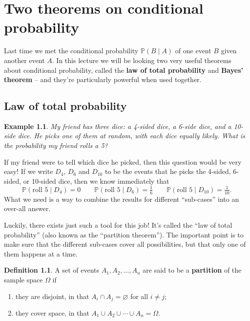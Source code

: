 \documentclass[
  a4paper,
]{book}
\providecommand{\tightlist}{%
  \setlength{\itemsep}{0pt}\setlength{\parskip}{0pt}}
\theoremstyle{definition}
\newtheorem{definition}{Definition}[chapter]
\theoremstyle{definition}
\newtheorem{example}{Example}[chapter]
\theoremstyle{definition}
\theoremstyle{definition}
\theoremstyle{remark}
\begin{document}
\hypertarget{L08-two-theorems}{%
\chapter{Two theorems on conditional probability}\label{L08-two-theorems}}

Last time we met the conditional probability \(\mathbb P(B \mid A)\) of one event \(B\) given another event \(A\). In this lecture we will be looking two very useful theorems about conditional probability, called the \textbf{law of total probability} and \textbf{Bayes' theorem} -- and they're particularly powerful when used together.

\hypertarget{total-prob}{%
\section{Law of total probability}\label{total-prob}}

\begin{example}
\protect\hypertarget{exm:dice-total}{}\label{exm:dice-total}\emph{My friend has three dice: a 4-sided dice, a 6-side dice, and a 10-side dice. He picks one of them at random, with each dice equally likely. What is the probability my friend rolls a 5?}

If my friend were to tell which dice he picked, then this question would be very easy! If we write \(D_4\), \(D_6\) and \(D_{10}\) to be the events that he picks the 4-sided, 6-sided, or 10-sided dice, then we know immediately that
\[ \mathbb P(\text{roll 5} \mid D_4) = 0 \qquad \mathbb P(\text{roll 5} \mid D_6) = \tfrac16 \qquad \mathbb P(\text{roll 5} \mid D_{10}) = \tfrac{1}{10} .  \]
What we need is a way to combine the results for different ``sub-cases'' into an over-all answer.
\end{example}

Luckily, there exists just such a tool for this job! It's called the ``law of total probability'' (also known as the ``partition theorem''). The important point is to make sure that the different sub-cases cover all possibilities, but that only one of them happens at a time.

\begin{definition}

A set of events \(A_1, A_2, \dots, A_n\) are said to be a \textbf{partition} of the sample space \(\Omega\) if

\begin{enumerate}
\def\labelenumi{\arabic{enumi}.}
\tightlist
\item
  they are disjoint, in that \(A_i \cap A_j = \varnothing\) for all \(i \neq j\);
\item
  they cover space, in that \(A_1 \cup A_2 \cup \cdots \cup A_n = \Omega\).
\end{enumerate}

\end{definition}
\end{document}
